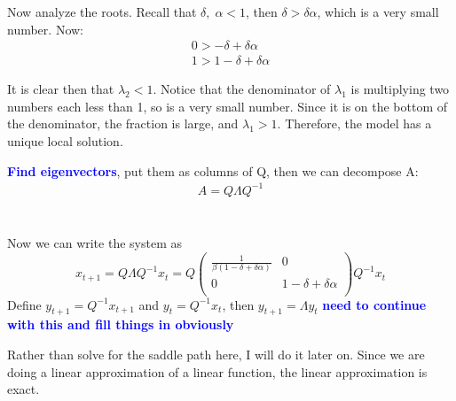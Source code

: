 \documentclass[12pt,oneside,reqno]{amsart}
\newcommand{\fix} [1] {\textbf{\textcolor{blue}{#1}}} %
\begin{document}
Now analyze the roots. Recall that $\delta,\;\alpha <1$, then $\delta > \delta\alpha$, which is a very small number. Now:
\begin{align*}
0 > -\delta +\delta\alpha 
\\
1 > 1-\delta +\delta\alpha
\end{align*}

It is clear then that $\lambda_2<1$. Notice that the denominator of $\lambda_1$ is multiplying two numbers each less than 1, so is a very small number. Since it is on the bottom of the denominator, the fraction is large, and $\lambda_1>1$. Therefore, the model has a unique local solution. 

\fix{Find eigenvectors}, put them as columns of Q, then we can decompose A:
\begin{align*}
A = Q \Lambda Q^{-1} 
\end{align*}
\\\\
Now we can write the system as 
\[x_{t+1} = Q\Lambda Q^{-1} x_t
    = Q \begin{pmatrix}
    \frac{1}{\beta(1-\delta+\delta\alpha)} & 0 \\
    0 & 1-\delta+\delta\alpha  \\
    \end{pmatrix} Q^{-1} x_t 
\] 
Define $y_{t+1} = Q^{-1}x_{t+1}$ and $y_t = Q^{-1}x_t$, then $y_{t+1} = \Lambda y_t$
\fix{need to continue with this and fill things in obviously} 

Rather than solve for the saddle path here, I will do it later on. Since we are doing a linear approximation of a linear function, the linear approximation is exact. 


\end{document}
